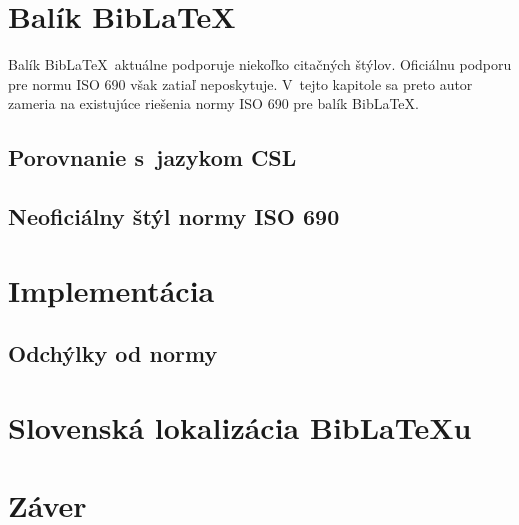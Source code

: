 \documentclass{fithesis3}
\begin{document}
\chapter{Balík Bib\LaTeX}
Balík Bib\LaTeX\, aktuálne podporuje niekoľko citačných štýlov. Oficiálnu podporu pre normu ISO 690 však zatiaľ neposkytuje. V~tejto kapitole sa preto autor zameria na existujúce riešenia normy ISO 690 pre balík Bib\LaTeX.

	\section{Porovnanie s~jazykom CSL}
	\section{Neoficiálny štýl normy ISO 690}

\chapter{Implementácia}
	\section{Odchýlky od normy}

\chapter{Slovenská lokalizácia Bib\LaTeX u}

\chapter{Záver}
\end{document}
